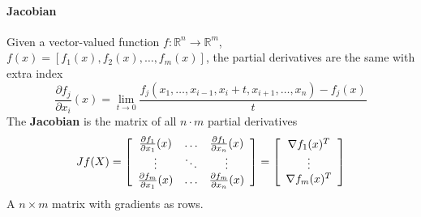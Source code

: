 \documentclass[10pt]{report}
\begin{document}
\paragraph{Jacobian} Given a vector-valued function $f:\mathbb{R}^n\rightarrow \mathbb{R}^m$, $f(x) = [f_1(x), f_2(x),\ldots,f_m(x)]$, the partial derivatives are the same with extra index $$\frac{\partial f_j}{\partial x_i}(x) = \lim_{t\rightarrow 0}\frac{f_j(x_1,\ldots,x_{i-1},x_i+t,x_{i+1},\ldots,x_n) - f_j(x)}{t}$$
The \textbf{Jacobian} is the matrix of all $n\cdot m$ partial derivatives
$$Jf(X) = \left[ \begin{array}{c c c}
\frac{\partial f_1}{\partial x_1}(x) & \ldots & \frac{\partial f_1}{\partial x_n}(x)\\
\vdots&\ddots&\vdots\\
\frac{\partial f_m}{\partial x_1}(x) & \ldots & \frac{\partial f_m}{\partial x_n}(x)\\
\end{array}\right] = \left[\begin{array}{c}
\nabla f_1(x)^T\\\vdots\\\nabla f_m(x)^T
\end{array}\right]$$
A $n\times m$ matrix with gradients as rows.
\end{document}
